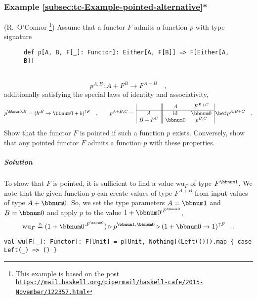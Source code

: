 \subsubsection{Example \label{subsec:tc-Example-pointed-alternative}\ref{subsec:tc-Example-pointed-alternative}{*}}

(R.~O\textsf{'}Connor \footnote{This example is based on the post \texttt{\href{https://mail.haskell.org/pipermail/haskell-cafe/2015-November/122357.html}{https://mail.haskell.org/pipermail/haskell-cafe/2015-November/122357.html}}})
Assume that a functor $F$ admits a function $p$ with type signature

\begin{wrapfigure}{l}{0.63\columnwidth}%
\vspace{-0.75\baselineskip}
\begin{lstlisting}
def p[A, B, F[_]: Functor]: Either[A, F[B]] => F[Either[A, B]]
\end{lstlisting}

\vspace{-0.6\baselineskip}
\end{wrapfigure}%

\noindent ~\vspace{-0.5\baselineskip}
\[
p^{A,B}:A+F^{B}\rightarrow F^{A+B}\quad,
\]
additionally satisfying the special laws of identity and associativity,
\[
p^{\bbnum 0,B}=(b^{:B}\rightarrow\bbnum 0+b)^{\uparrow F}\quad,\quad\quad p^{A+B,C}=\,\begin{array}{|c||cc|}
 & A & F^{B+C}\\
\hline A & \text{id} & \bbnum 0\\
B+F^{C} & \bbnum 0 & p^{B,C}
\end{array}\,\bef p^{A,B+C}\quad.
\]
Show that the functor $F$ is pointed if such a function $p$ exists.
Conversely, show that any pointed functor $F$ admits a function $p$
with these properties.

\subparagraph{Solution}

To show that $F$ is pointed, it is sufficient to find a value $\text{wu}_{F}$
of type $F^{\bbnum 1}$. We note that the given function $p$ can
create values of type $F^{A+B}$ from input values of type $A+\bbnum 0$.
So, we set the type parameters $A=\bbnum 1$ and $B=\bbnum 0$ and
apply $p$ to the value $1+\bbnum 0^{:F^{\bbnum 0}}$,
\[
\text{wu}_{F}\triangleq(1+\bbnum 0^{:F^{\bbnum 0}})\triangleright p^{\bbnum 1,\bbnum 0}\triangleright(1+\bbnum 0\rightarrow1)^{\uparrow F}\quad.
\]
\begin{lstlisting}
val wu[F[_]: Functor]: F[Unit] = p[Unit, Nothing](Left(())).map { case Left(_) => () }
\end{lstlisting}

